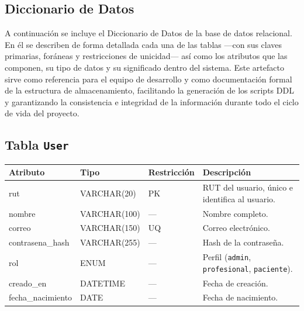 \subsection{Diccionario de Datos}
\label{ssc:DD}
A continuación se incluye el Diccionario de Datos de la base de datos relacional. En él se describen de forma detallada cada una de las tablas —con sus claves primarias, foráneas y restricciones de unicidad— así como los atributos que las componen, su tipo de datos y su significado dentro del sistema. Este artefacto sirve como referencia para el equipo de desarrollo y como documentación formal de la estructura de almacenamiento, facilitando la generación de los scripts DDL y garantizando la consistencia e integridad de la información durante todo el ciclo de vida del proyecto.

\renewcommand{\arraystretch}{1.0}   %

\subsection*{Tabla \texttt{User}}
{\footnotesize
\begin{tabularx}{\textwidth}{l l l X}
\hline
\textbf{Atributo} & \textbf{Tipo} & \textbf{Restricción} & \textbf{Descripción} \\\hline
rut               & VARCHAR(20)   & PK                   & RUT del usuario, único e identifica al usuario. \\
nombre            & VARCHAR(100)  & —                    & Nombre completo. \\
correo            & VARCHAR(150)  & UQ                   & Correo electrónico. \\
contrasena\_hash  & VARCHAR(255)  & —                    & Hash de la contraseña. \\
rol               & ENUM          & —                    & Perfil (\texttt{admin}, \texttt{profesional}, \texttt{paciente}). \\
creado\_en        & DATETIME      & —                    & Fecha de creación. \\
fecha\_nacimiento & DATE          & —                    & Fecha de nacimiento. \\\hline
\end{tabularx}
}

